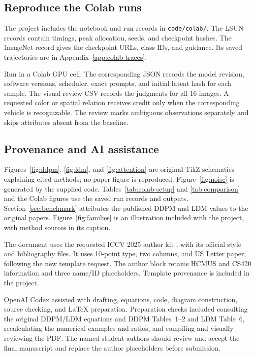 \subsection{Reproduce the Colab runs}
The project includes the notebook and run records in \texttt{code/colab/}.
The LSUN records contain timings, peak allocation, seeds, and checkpoint
hashes. The ImageNet record gives the checkpoint URLs, class IDs, and
guidance. Its saved trajectories are in Appendix~\ref{app:colab-traces}.

Run  in a Colab GPU cell.
The corresponding JSON records the model revision, software versions,
scheduler, exact prompts, and initial latent hash for each sample.
The visual review CSV records the judgments for all 16 images.
A requested color or spatial relation receives credit only when the
corresponding vehicle is recognizable. The review marks ambiguous
observations separately and skips attributes absent from the baseline.

\subsection{Provenance and AI assistance}
Figures~\ref{fig:ddpm}, \ref{fig:ldm}, and \ref{fig:attention} are original
TikZ schematics explaining cited methods; no paper figure is reproduced.
Figure~\ref{fig:noise} is generated by the supplied code. Tables~\ref{tab:colab-setup} and \ref{tab:comparison} and the Colab
figures use the saved run records and outputs. Section~\ref{sec:benchmark} attributes the
published DDPM and LDM values to the original papers.
Figure~\ref{fig:families} is an illustration included with the project,
with method sources in its caption.

The document uses the requested ICCV 2025 author kit
\cite{template}, with its official style and bibliography files.
It uses 10-point type, two columns, and US Letter paper, following the
new template request. The author block retains HCMUS and CS420 information
and three name/ID placeholders. Template provenance is included in the project.

OpenAI Codex \cite{codex} assisted with drafting, equations, code,
diagram construction, source checking, and LaTeX preparation.
Preparation checks included consulting the original DDPM/LDM equations and
DDPM Tables~1--2 and LDM Table~6, recalculating the numerical examples and ratios, and compiling
and visually reviewing the PDF. The named student authors should review
and accept the final manuscript and replace the author placeholders before
submission.

